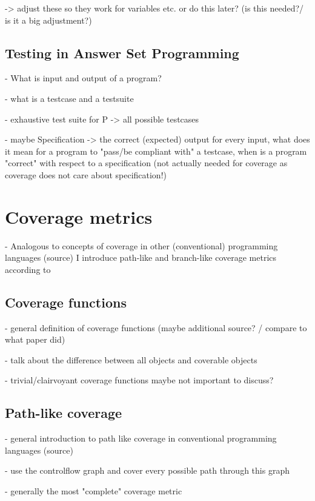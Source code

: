 -> adjust these so they work for variables etc. or do this later? (is this needed?/ is it a big adjustment?)

\section{Testing in Answer Set Programming}
\label{sec:Preliminaries/Testing in Answer Set Programming}
- What is input and output of a program?

- what is a testcase and a testsuite

- exhaustive test suite for P -> all possible testcases

- maybe Specification -> the correct (expected) output for every input, what does it mean for a program to "pass/be compliant 
with" a testcase, when is a program "correct" with respect to a specification (not actually needed for coverage as coverage 
does not care about specification!)

\chapter{Coverage metrics}
\label{ch:Coverage metrics}
- Analogous to concepts of coverage in other (conventional) programming languages (source) I introduce path-like and branch-like coverage
metrics according to \textcite{Jan+10}

\section{Coverage functions}
\label{sec:Coverage metrics/Coverage functions}
- general definition of coverage functions (maybe additional source? / compare to what paper did)

- talk about the difference between all objects and coverable objects

- trivial/clairvoyant coverage functions maybe not important to discuss?

\section{Path-like coverage}
\label{sec:Coverage metrics/Path-like coverage}
- general introduction to path like coverage in conventional programming languages (source)

    - use the controlflow graph and cover every possible path through this graph

- generally the most "complete" coverage metric

